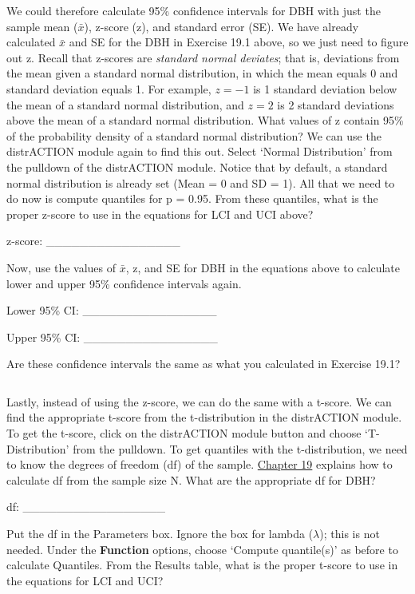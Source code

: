 \documentclass[
  openany]{krantz}
\begin{document}
We could therefore calculate 95\% confidence intervals for DBH with just the sample mean (\(\bar{x}\)), z-score (z), and standard error (SE).
We have already calculated \(\bar{x}\) and SE for the DBH in Exercise 19.1 above, so we just need to figure out z.
Recall that z-scores are \emph{standard normal deviates}; that is, deviations from the mean given a standard normal distribution, in which the mean equals 0 and standard deviation equals 1.
For example, \(z = -1\) is 1 standard deviation below the mean of a standard normal distribution, and \(z = 2\) is 2 standard deviations above the mean of a standard normal distribution.
What values of z contain 95\% of the probability density of a standard normal distribution?
We can use the distrACTION module again to find this out.
Select `Normal Distribution' from the pulldown of the distrACTION module.
Notice that by default, a standard normal distribution is already set (Mean = 0 and SD = 1).
All that we need to do now is compute quantiles for p = 0.95.
From these quantiles, what is the proper z-score to use in the equations for LCI and UCI above?

z-score: \_\_\_\_\_\_\_\_\_\_\_\_\_\_\_\_

Now, use the values of \(\bar{x}\), z, and SE for DBH in the equations above to calculate lower and upper 95\% confidence intervals again.

Lower 95\% CI: \_\_\_\_\_\_\_\_\_\_\_\_\_\_\_\_

Upper 95\% CI: \_\_\_\_\_\_\_\_\_\_\_\_\_\_\_\_

Are these confidence intervals the same as what you calculated in Exercise 19.1?

\begin{verbatim}

\end{verbatim}

Lastly, instead of using the z-score, we can do the same with a t-score.
We can find the appropriate t-score from the t-distribution in the distrACTION module.
To get the t-score, click on the distrACTION module button and choose `T-Distribution' from the pulldown.
To get quantiles with the t-distribution, we need to know the degrees of freedom (df) of the sample.
\protect\hyperlink{Chapter_19}{Chapter 19} explains how to calculate df from the sample size N.
What are the appropriate df for DBH?

df: \_\_\_\_\_\_\_\_\_\_\_\_\_\_\_\_\_

Put the df in the Parameters box.
Ignore the box for lambda (\(\lambda\)); this is not needed.
Under the \textbf{Function} options, choose `Compute quantile(s)' as before to calculate Quantiles.
From the Results table, what is the proper t-score to use in the equations for LCI and UCI?
\end{document}
